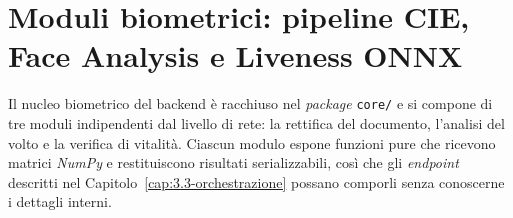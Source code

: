 \newpage
\section{Moduli biometrici: pipeline CIE, Face Analysis e Liveness ONNX}\label{cap:3.2-moduliBiometrici}
Il nucleo biometrico del backend è racchiuso nel \textit{package} \texttt{core/} e si compone di tre moduli indipendenti dal livello di rete: la rettifica del documento, l'analisi del volto e la verifica di vitalità.
Ciascun modulo espone funzioni pure che ricevono matrici \textit{NumPy} e restituiscono risultati serializzabili, così che gli \textit{endpoint} descritti nel Capitolo~\ref{cap:3.3-orchestrazione} possano comporli senza conoscerne i dettagli interni.

